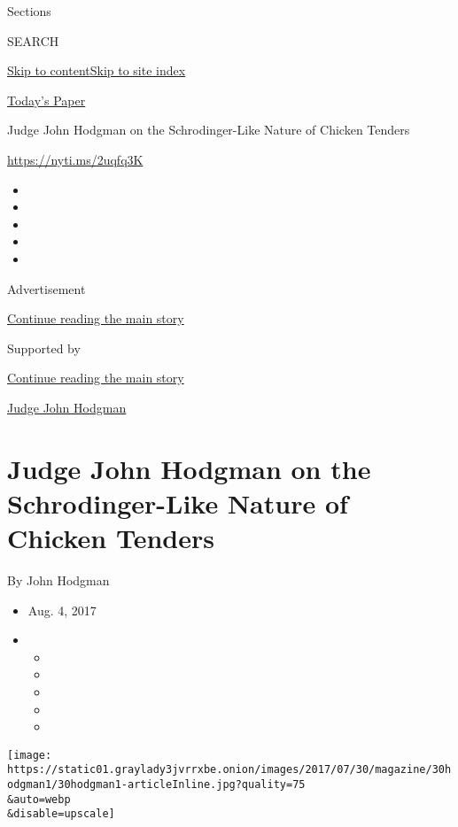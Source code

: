 Sections

SEARCH

\protect\hyperlink{site-content}{Skip to
content}\protect\hyperlink{site-index}{Skip to site index}

\href{https://myaccount.nytimes3xbfgragh.onion/auth/login?response_type=cookie\&client_id=vi}{}

\href{https://www.nytimes3xbfgragh.onion/section/todayspaper}{Today's
Paper}

Judge John Hodgman on the Schrodinger-Like Nature of Chicken Tenders

\url{https://nyti.ms/2uqfq3K}

\begin{itemize}
\item
\item
\item
\item
\item
\end{itemize}

Advertisement

\protect\hyperlink{after-top}{Continue reading the main story}

Supported by

\protect\hyperlink{after-sponsor}{Continue reading the main story}

\href{/column/judge-john-hodgman}{Judge John Hodgman}

\hypertarget{judge-john-hodgman-on-the-schrodinger-like-nature-of-chicken-tenders}{%
\section{Judge John Hodgman on the Schrodinger-Like Nature of Chicken
Tenders}\label{judge-john-hodgman-on-the-schrodinger-like-nature-of-chicken-tenders}}

By John Hodgman

\begin{itemize}
\item
  Aug. 4, 2017
\item
  \begin{itemize}
  \item
  \item
  \item
  \item
  \item
  \end{itemize}
\end{itemize}

\texttt{[image: https://static01.graylady3jvrrxbe.onion/images/2017/07/30/magazine/30hodgman1/30hodgman1-articleInline.jpg?quality=75\\\&auto=webp\\\&disable=upscale]}

